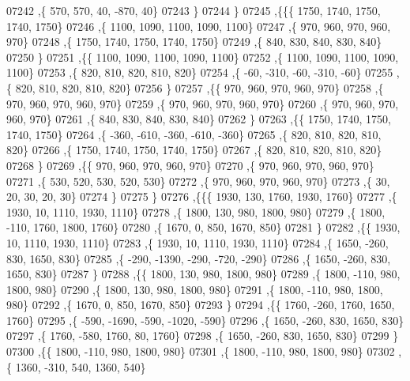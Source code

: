 \begin{DoxyCode}
07242     ,\{   570,   570,    40,  -870,    40\}
07243     \}
07244    \}
07245   ,\{\{\{  1750,  1740,  1750,  1740,  1750\}
07246     ,\{  1100,  1090,  1100,  1090,  1100\}
07247     ,\{   970,   960,   970,   960,   970\}
07248     ,\{  1750,  1740,  1750,  1740,  1750\}
07249     ,\{   840,   830,   840,   830,   840\}
07250     \}
07251    ,\{\{  1100,  1090,  1100,  1090,  1100\}
07252     ,\{  1100,  1090,  1100,  1090,  1100\}
07253     ,\{   820,   810,   820,   810,   820\}
07254     ,\{   -60,  -310,   -60,  -310,   -60\}
07255     ,\{   820,   810,   820,   810,   820\}
07256     \}
07257    ,\{\{   970,   960,   970,   960,   970\}
07258     ,\{   970,   960,   970,   960,   970\}
07259     ,\{   970,   960,   970,   960,   970\}
07260     ,\{   970,   960,   970,   960,   970\}
07261     ,\{   840,   830,   840,   830,   840\}
07262     \}
07263    ,\{\{  1750,  1740,  1750,  1740,  1750\}
07264     ,\{  -360,  -610,  -360,  -610,  -360\}
07265     ,\{   820,   810,   820,   810,   820\}
07266     ,\{  1750,  1740,  1750,  1740,  1750\}
07267     ,\{   820,   810,   820,   810,   820\}
07268     \}
07269    ,\{\{   970,   960,   970,   960,   970\}
07270     ,\{   970,   960,   970,   960,   970\}
07271     ,\{   530,   520,   530,   520,   530\}
07272     ,\{   970,   960,   970,   960,   970\}
07273     ,\{    30,    20,    30,    20,    30\}
07274     \}
07275    \}
07276   ,\{\{\{  1930,   130,  1760,  1930,  1760\}
07277     ,\{  1930,    10,  1110,  1930,  1110\}
07278     ,\{  1800,   130,   980,  1800,   980\}
07279     ,\{  1800,  -110,  1760,  1800,  1760\}
07280     ,\{  1670,     0,   850,  1670,   850\}
07281     \}
07282    ,\{\{  1930,    10,  1110,  1930,  1110\}
07283     ,\{  1930,    10,  1110,  1930,  1110\}
07284     ,\{  1650,  -260,   830,  1650,   830\}
07285     ,\{  -290, -1390,  -290,  -720,  -290\}
07286     ,\{  1650,  -260,   830,  1650,   830\}
07287     \}
07288    ,\{\{  1800,   130,   980,  1800,   980\}
07289     ,\{  1800,  -110,   980,  1800,   980\}
07290     ,\{  1800,   130,   980,  1800,   980\}
07291     ,\{  1800,  -110,   980,  1800,   980\}
07292     ,\{  1670,     0,   850,  1670,   850\}
07293     \}
07294    ,\{\{  1760,  -260,  1760,  1650,  1760\}
07295     ,\{  -590, -1690,  -590, -1020,  -590\}
07296     ,\{  1650,  -260,   830,  1650,   830\}
07297     ,\{  1760,  -580,  1760,    80,  1760\}
07298     ,\{  1650,  -260,   830,  1650,   830\}
07299     \}
07300    ,\{\{  1800,  -110,   980,  1800,   980\}
07301     ,\{  1800,  -110,   980,  1800,   980\}
07302     ,\{  1360,  -310,   540,  1360,   540\}

\end{DoxyCode}
